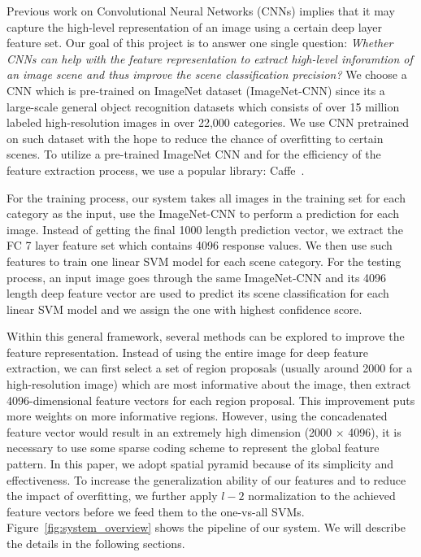 
Previous work on Convolutional Neural Networks (CNNs) implies that it may capture the high-level representation of an image
using a certain deep layer feature set. Our goal of this project is to answer one single question: \emph{Whether CNNs can help with the feature representation
to extract high-level inforamtion of an image scene and thus improve the scene classification precision?} 
We choose a CNN which is pre-trained on ImageNet dataset (ImageNet-CNN) since its a large-scale general object recognition datasets which consists of over 15 million labeled
high-resolution images in over 22,000 categories. We use CNN pretrained on such dataset with the hope to reduce the chance of overfitting to certain scenes.
To utilize a pre-trained ImageNet CNN and for the efficiency of the feature extraction process, we use a popular library: Caffe~\cite{Jia:2014:CCA}.

For the training process, our system takes all images in the training set for each category as the input, use the ImageNet-CNN to perform a prediction for each image. Instead of
getting the final 1000 length prediction vector, we extract the FC 7 layer feature set which contains 4096 response values. We then use such features to train one linear SVM model
for each scene category. For the testing process, an input image goes through the same ImageNet-CNN and its 4096 length deep feature vector are used to predict its scene classification
for each linear SVM model and we assign the one with highest confidence score.

Within this general framework, several methods can be explored to improve the feature representation. Instead of using the entire image for deep feature extraction, we can first
select a set of region proposals (usually around 2000 for a high-resolution image) which are most informative about the image, then extract 4096-dimensional feature vectors for each region proposal. This improvement puts more weights on more informative regions. However, using the concadenated feature vector would result in an extremely high dimension (2000 $\times$ 4096), it is necessary to use some sparse coding scheme to represent the global feature pattern. In this paper, we adopt spatial pyramid because of its simplicity and effectiveness. To increase the generalization ability of our features and to reduce the impact of overfitting, we further apply $l-2$ normalization to the achieved feature vectors before we feed them to the one-vs-all SVMs. Figure~\ref{fig:system_overview} shows the pipeline of our system. We will describe the details in the following sections.

